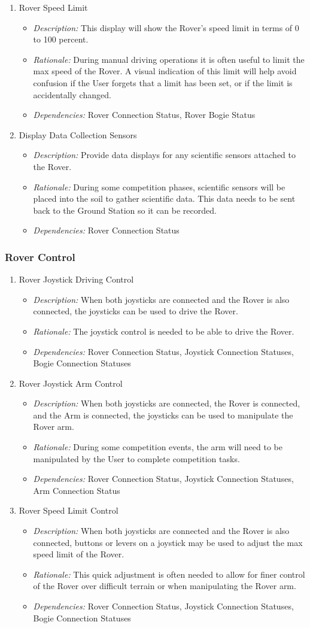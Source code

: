 \documentclass[onecolumn, draftclsnofoot, 10pt, compsoc]{IEEEtran}
\newcommand{\functRequ}[4]{
\item #1%
\par
\begin{itemize}
\item \textit{Description:} #2.%
\item \textit{Rationale:} #3.%
\item \textit{Dependencies:} #4%
\end{itemize}
}
\begin{document}
\begin{enumerate}
\functRequ{Rover Speed Limit}
{This display will show the Rover's speed limit in terms of 0 to 100 percent}
{During manual driving operations it is often useful to limit the max speed of the Rover.
A visual indication of this limit will help avoid confusion if the User forgets that a limit has been set, or if the limit is accidentally changed}
{Rover Connection Status, Rover Bogie Status}

\functRequ{Display Data Collection Sensors}
{Provide data displays for any scientific sensors attached to the Rover}
{During some competition phases, scientific sensors will be placed into the soil to gather scientific data.
This data needs to be sent back to the Ground Station so it can be recorded}
{Rover Connection Status}
\end{enumerate}

\subsubsection{Rover Control}
\begin{enumerate}
\functRequ{Rover Joystick Driving Control}
{When both joysticks are connected and the Rover is also connected, the joysticks can be used to drive the Rover}
{The joystick control is needed to be able to drive the Rover}
{Rover Connection Status, Joystick Connection Statuses, Bogie Connection Statuses}

\functRequ{Rover Joystick Arm Control}
{When both joysticks are connected, the Rover is connected, and the Arm is connected, the joysticks can be used to manipulate the Rover arm}
{During some competition events, the arm will need to be manipulated by the User to complete competition tasks}
{Rover Connection Status, Joystick Connection Statuses, Arm Connection Status}

\functRequ{Rover Speed Limit Control}
{When both joysticks are connected and the Rover is also connected, buttons or levers on a joystick may be used to adjust the max speed limit of the Rover}
{This quick adjustment is often needed to allow for finer control of the Rover over difficult terrain or when manipulating the Rover arm}
{Rover Connection Status, Joystick Connection Statuses, Bogie Connection Statuses}
\end{enumerate}
\end{document}
